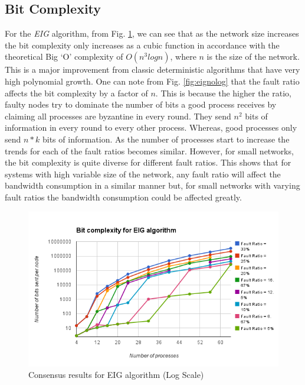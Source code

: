 \subsection{Bit Complexity}
For the \textit{EIG} algorithm, from Fig. \ref{fig:eig}, we can see that as the network size increases the bit complexity only increases as a cubic function in accordance with the theoretical Big `O' complexity of $O(n^3 logn)$, where $n$ is the size of the network. This is a major improvement from classic deterministic algorithms that have very high polynomial growth. One can note from Fig. \ref{fig:eignolog} that the fault ratio affects the bit complexity by a factor of $n$. This is because the higher the ratio, faulty nodes try to dominate the number of bits a good process receives by claiming all processes are byzantine in every round. They send $n^2$ bits of information in every round to every other process. Whereas, good processes only send $n*k$ bits of information. As the number of processes start to increase the trends for each of the fault ratios becomes similar. However, for small networks, the bit complexity is quite diverse for different fault ratios. This shows that for systems with high variable size of the network, any fault ratio will affect the bandwidth consumption in a similar manner but, for small networks with varying fault ratios the bandwidth consumption could be affected greatly.   
\begin{figure}[ht]
 \centering
\includegraphics[scale=0.4]{eig}
\caption{Consensus results for EIG algorithm (Log Scale)}
 \label{fig:eig}
\end{figure}

